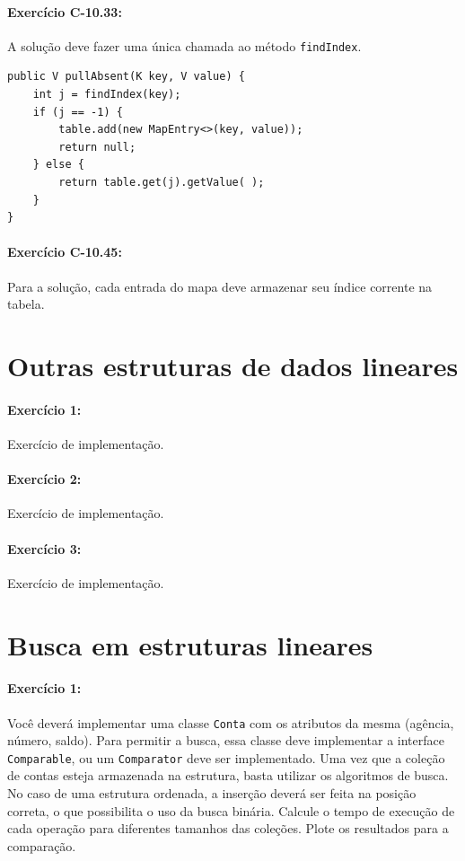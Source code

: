 \paragraph{Exercício C-10.33:}
A solução deve fazer uma única chamada ao método \texttt{findIndex}.

\begin{lstlisting}[frame=single]
public V pullAbsent(K key, V value) {
	int j = findIndex(key);
	if (j == -1) {
		table.add(new MapEntry<>(key, value));
		return null;
	} else {
		return table.get(j).getValue( );
	}
}
\end{lstlisting}

\paragraph{Exercício C-10.45:}
Para a solução, cada entrada do mapa deve armazenar seu índice corrente na tabela.

\section{Outras estruturas de dados lineares}

\paragraph{Exercício 1:}
Exercício de implementação.

\paragraph{Exercício 2:}
Exercício de implementação.

\paragraph{Exercício 3:}
Exercício de implementação.


\section{Busca em estruturas lineares}

\paragraph{Exercício 1:}
Você deverá implementar uma classe \texttt{Conta} com os atributos da mesma (agência, número, saldo). Para permitir a busca, essa classe deve implementar a interface \texttt{Comparable}, ou um \texttt{Comparator} deve ser implementado. Uma vez que a coleção de contas esteja armazenada na estrutura, basta utilizar os algoritmos de busca. No caso de uma estrutura ordenada, a inserção deverá ser feita na posição correta, o que possibilita o uso da busca binária. Calcule o tempo de execução de cada operação para diferentes tamanhos das coleções. Plote os resultados para a comparação.

